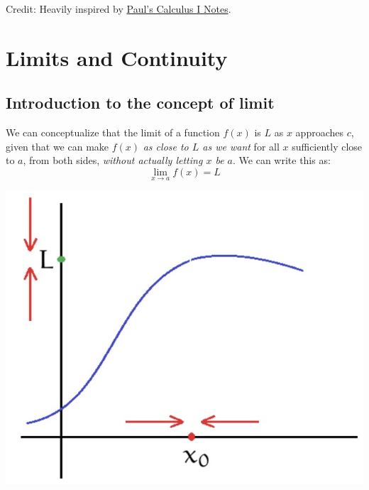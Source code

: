 \documentclass{article}
\begin{document}



\begin{center}
    Credit: Heavily inspired by \href{https://tutorial.math.lamar.edu/Classes/CalcI/CalcI.aspx}{Paul's Calculus I Notes}.
\end{center}

\section{Limits and Continuity}

\subsection{Introduction to the concept of limit}
\begin{minipage}{0.65\textwidth}
    We can conceptualize that the limit of a function $f(x)$ is $L$ as $x$ approaches $c$, given that we can make $f(x)$ \emph{as close to $L$ as we want} for all $x$ sufficiently close to $a$, from both sides, \emph{without actually letting $x$ be $a$}. We can write this as:
    \[\lim_{x\to a}f(x)=L\]
\end{minipage}
\hfill
\begin{minipage}{0.3\textwidth}
    \includegraphics[width=\textwidth]{img/Lim.jpg}
\end{minipage}
\end{document}
